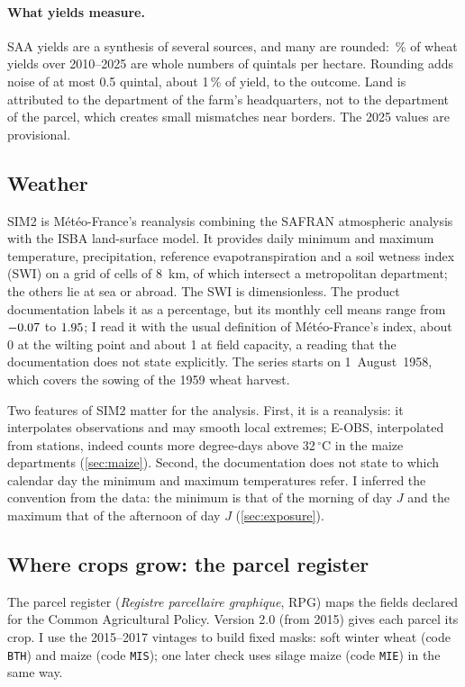 \paragraph{What yields measure.} SAA yields are a synthesis of several sources, and many are rounded: \WheatIntegerShare\,\% of wheat yields over 2010--2025 are whole numbers of quintals per hectare. Rounding adds noise of at most 0.5 quintal, about 1\,\% of yield, to the outcome. Land is attributed to the department of the farm's headquarters, not to the department of the parcel, which creates small mismatches near borders. The 2025 values are provisional.

\subsection{Weather}

SIM2 is Météo-France's reanalysis combining the SAFRAN atmospheric analysis with the ISBA land-surface model. It provides daily minimum and maximum temperature, precipitation, reference evapotranspiration and a soil wetness index (SWI) on a grid of \SimCells{} cells of 8~km, of which \SimCellsFrance{} intersect a metropolitan department; the others lie at sea or abroad. The SWI is dimensionless. The product documentation labels it as a percentage, but its monthly cell means range from $-0.07$ to $1.95$; I read it with the usual definition of Météo-France's index, about 0 at the wilting point and about 1 at field capacity, a reading that the documentation does not state explicitly. The series starts on 1~August~1958, which covers the sowing of the 1959 wheat harvest.

Two features of SIM2 matter for the analysis. First, it is a reanalysis: it interpolates observations and may smooth local extremes; E-OBS, interpolated from stations, indeed counts more degree-days above 32\,$^{\circ}$C in the maize departments (\cref{sec:maize}). Second, the documentation does not state to which calendar day the minimum and maximum temperatures refer. I inferred the convention from the data: the minimum is that of the morning of day $J$ and the maximum that of the afternoon of day $J$ (\cref{sec:exposure}).

\subsection{Where crops grow: the parcel register}

The parcel register (\emph{Registre parcellaire graphique}, RPG) maps the fields declared for the Common Agricultural Policy. Version 2.0 (from 2015) gives each parcel its crop. I use the 2015--2017 vintages to build fixed masks: soft winter wheat (code \texttt{BTH}) and maize (code \texttt{MIS}); one later check uses silage maize (code \texttt{MIE}) in the same way.

